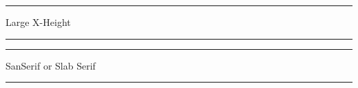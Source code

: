 \hrule
{\Large Large X-Height}
\hrule

\fontsample{\ApparatusSIL}
\fontsample{\Brill}
\fontsample{\Calisto}
\fontsample{\Cambria}
\fontsample{\Charis}
\fontsample{\Constantia}
\fontsample{\DroidSerif}
\fontsample{\Fontin}
\fontsample{\Gentium}
\fontsample{\Georgia}
\fontsample{\LucidaBright}
\fontsample{\LucidaFax}
\fontsample{\Palatino}
\fontsample{\PalatinoLinotype}
\fontsample{\TexGyrePagella}
\fontsample{\Prociono}
\fontsample{\Vollkorn}

\hrule
{\Large SanSerif or Slab Serif}
\hrule

\fontsample{\Aller}
\fontsample{\Arvo}
\fontsample{\Cabin}
\fontsample{\Calibri}
\fontsample{\Candara}
\fontsample{\Chaparral}
\fontsample{\Contra}
\fontsample{\Corbel}
\fontsample{\Delicious}
\fontsample{\Diavlo}
\fontsample{\FontinSans}
\fontsample{\GrandesignNeueSerif}
\fontsample{\Jura}
\fontsample{\LuxiSans}
\fontsample{\MyriadPro}
\fontsample{\Poly}
\fontsample{\PTSans}
\fontsample{\Quattrocento}


